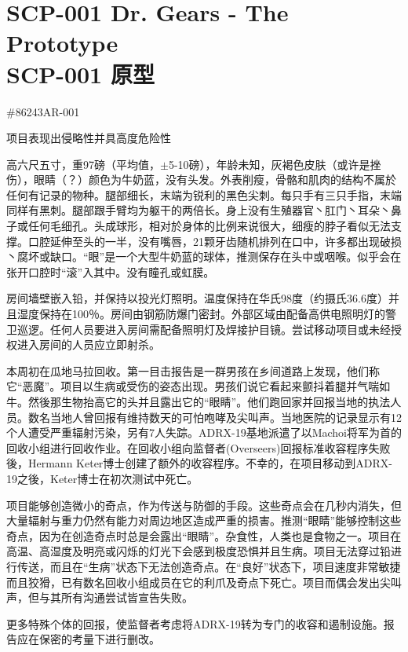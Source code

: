 \chapter[SCP-001 原型]{
	SCP-001 Dr. Gears - The Prototype \\
	SCP-001 原型
}

\label{chap:SCP-001.the.prototype}

\#86243AR-001

项目表现出侵略性并具高度危险性


高六尺五寸，重97磅（平均值，$\pm$5-10磅），年龄未知，灰褐色皮肤（或许是挫伤），眼睛（？）颜色为牛奶蓝，没有头发。外表削瘦，骨骼和肌肉的结构不属於任何有记录的物种。腿部细长，末端为锐利的黑色尖刺。每只手有三只手指，末端同样有黑刺。腿部跟手臂均为躯干的两倍长。身上没有生殖器官丶肛门丶耳朵丶鼻子或任何毛细孔。头成球形，相对於身体的比例来说很大，细瘦的脖子看似无法支撑。口腔延伸至头的一半，没有嘴唇，21颗牙齿随机排列在口中，许多都出现破损丶腐坏或缺口。“眼”是一个大型牛奶蓝的球体，推测保存在头中或咽喉。似乎会在张开口腔时“滚”入其中。没有瞳孔或虹膜。


房间墙壁嵌入铅，并保持以投光灯照明。温度保持在华氏98度（约摄氏36.6度）并且湿度保持在100％。房间由钢筋防爆门密封。外部区域由配备高供电照明灯的警卫巡逻。任何人员要进入房间需配备照明灯及焊接护目镜。尝试移动项目或未经授权进入房间的人员应立即射杀。


本周初在瓜地马拉回收。第一目击报告是一群男孩在乡间道路上发现，他们称它“恶魔”。项目以生病或受伤的姿态出现。男孩们说它看起来颤抖着腿并气喘如牛。然後那生物抬高它的头并且露出它的“眼睛”。他们跑回家并回报当地的执法人员。数名当地人曾回报有维持数天的可怕咆哮及尖叫声。当地医院的记录显示有12个人遭受严重辐射污染，另有7人失踪。ADRX-19基地派遣了以Machoi将军为首的回收小组进行回收作业。在回收小组向监督者(Overseers)回报标准收容程序失败後，Hermann Keter博士创建了额外的收容程序。不幸的，在项目移动到ADRX-19之後，Keter博士在初次测试中死亡。

项目能够创造微小的奇点，作为传送与防御的手段。这些奇点会在几秒内消失，但大量辐射与重力仍然有能力对周边地区造成严重的损害。推测“眼睛”能够控制这些奇点，因为在创造奇点时总是会露出“眼睛”。杂食性，人类也是食物之一。项目在高温、高湿度及明亮或闪烁的灯光下会感到极度恐惧并且生病。项目无法穿过铅进行传送，而且在“生病”状态下无法创造奇点。在“良好”状态下，项目速度非常敏捷而且狡猾，已有数名回收小组成员在它的利爪及奇点下死亡。项目而偶会发出尖叫声，但与其所有沟通尝试皆宣告失败。

更多特殊个体的回报，使监督者考虑将ADRX-19转为专门的收容和遏制设施。报告应在保密的考量下进行删改。
